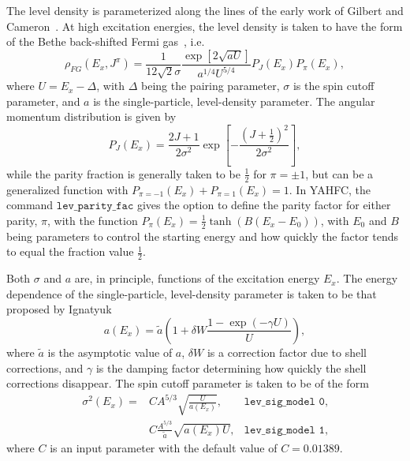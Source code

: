 \documentclass[
10pt,
showpacs,preprintnumbers,footinbib,
amsfonts,amsmath,amssymb,
aps,
prc,twocolumn,groupedaddress,superscriptaddress,
showkeys,
nofootinbib
]{revtex4-1}
\begin{document}
The level density is parameterized along the lines of the early work of Gilbert and Cameron~\cite{Gilbert:1965}. At high excitation energies, the level density is taken to have the form of the Bethe back-shifted Fermi gas~\cite{Bethe:1937}, i.e.
\begin{equation}
\rho_{FG}(E_x,J^\pi) = \frac{1}{12\sqrt{2}\sigma}\frac{\exp\left[2\sqrt{aU}\right ]}{a^{1/4}U^{5/4}} P_J(E_x) P_\pi(E_x),
\label{eq:rho_BFM}
\end{equation}
where $U=E_x - \Delta$, with $\Delta$ being the pairing parameter, $\sigma$ is the spin cutoff parameter, and $a$ is the single-particle, level-density parameter. The angular momentum distribution is given by
\begin{equation}
P_J(E_x) = \frac{2J+1}{2\sigma^2}\exp \left [ - \frac{(J+\frac{1}{2})^2}{2\sigma^2} \right ],
\end{equation}
while the parity fraction is generally taken to be $\frac{1}{2}$ for $\pi = \pm 1$, but can be a generalized function with $P_{\pi=-1}(E_x) + P_{\pi=1}(E_x) = 1$.  In YAHFC, the command ${\texttt{lev\_parity\_fac}}$ gives the option to define the parity factor for either parity, $\pi$, with the function $P_\pi(E_x) = \frac{1}{2}\tanh(B(E_x-E_0))$, with $E_0$ and $B$ being parameters to control the starting energy and how quickly the factor tends to equal the fraction value $\frac{1}{2}$.

Both $\sigma$ and $a$ are, in principle, functions of the excitation energy $E_x$. The energy dependence of the single-particle, level-density parameter is taken to be that proposed by Ignatyuk
\begin{equation}
a(E_x) = \tilde a \left ( 1+\delta W\frac{1-\exp(-\gamma U)}{U}\right),
\end{equation}
where $\tilde a$ is the asymptotic value of $a$, $\delta W$ is a correction factor due to shell corrections, and $\gamma$ is the damping factor determining how quickly the shell corrections disappear. The spin cutoff parameter is taken to be of the form
\begin{align}
\label{eq:sig_0}
\sigma^2(E_x) = & CA^{5/3}\sqrt{\frac{U}{a(E_x)}}, &{\texttt{lev\_sig\_model 0}}, \\
\label{eq:sig_1}
 & C\frac{A^{5/3}}{\tilde a}\sqrt{a(E_x)U}, &{\texttt{lev\_sig\_model 1}},
\end{align}
where $C$ is an input parameter with the default value of $C=0.01389$.
\end{document}

